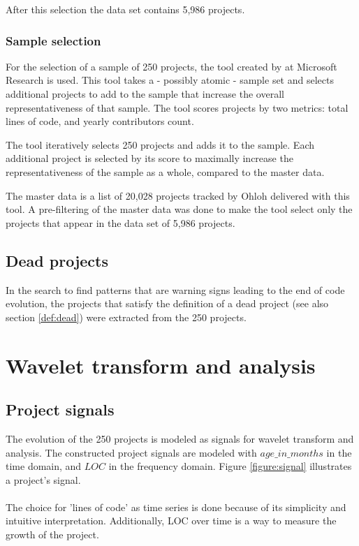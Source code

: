 After this selection the data set contains 5,986 projects.

\subsubsection{Sample selection}
For the selection of a sample of 250 projects, the tool created by
\citet{nagappan} at Microsoft Research is used. This tool takes a - possibly
atomic - sample set and selects additional projects to add to the sample that
increase the overall representativeness of that sample. The tool scores
projects by two metrics: total lines of code, and yearly contributors count.

The tool iteratively selects 250 projects and adds it to the sample. Each
additional project is selected by its score to maximally increase the
representativeness of the sample as a whole, compared to the master data.

The master data is a list of 20,028 projects tracked by Ohloh delivered with
this tool. A pre-filtering of the master data was done to make the tool select
only the projects that appear in the data set of 5,986 projects.

\subsection{Dead projects}
In the search to find patterns that are warning signs leading to the end of
code evolution, the projects that satisfy the definition of a dead project (see
also section \ref{def:dead}) were extracted from the 250 projects.

\section{Wavelet transform and analysis}
\subsection{Project signals}
\label{section:signals}
The evolution of the 250 projects is modeled as signals for wavelet transform
and analysis. The constructed project signals are modeled with
$age\_in\_months$ in the time domain, and $LOC$ in the frequency domain. Figure
\ref{figure:signal} illustrates a project's signal.



\paragraph{}
The choice for 'lines of code' as time series is done because of its simplicity
and intuitive interpretation. Additionally, LOC over time is a way to measure
the growth of the project.

